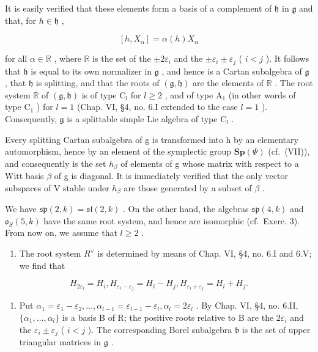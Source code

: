 It is easily verified that these elements form a basis of a complement of \(\mathfrak{h}\) in \(\mathfrak{g}\) and that, for \(h\in \mathfrak{h}\) ,

\[
[ h, X _ {\alpha} ] = \alpha (h) X _ {\alpha}\tag{7}
\]

for all \(\alpha \in \mathbb{R}\) , where \(\mathbb{R}\) is the set of the \(\pm 2\varepsilon_{i}\) and the \(\pm \varepsilon_{i} \pm \varepsilon_{j}\) ( \(i < j\) ). It follows that \(\mathfrak{h}\) is equal to its own normalizer in \(\mathfrak{g}\) , and hence is a Cartan subalgebra of \(\mathfrak{g}\) , that \(\mathfrak{h}\) is splitting, and that the roots of \((\mathfrak{g}, \mathfrak{h})\) are the elements of \(\mathbb{R}\) . The root system \(\mathbb{R}\) of \((\mathfrak{g}, \mathfrak{h})\) is of type \(\mathrm{C}_{l}\) for \(l \geq 2\) , and of type \(\mathrm{A}_{1}\) (in other words of type \(\mathrm{C}_{1}\) ) for \(l = 1\) (Chap. VI, §4, no. 6.I extended to the case \(l = 1\) ). Consequently, \(\mathfrak{g}\) is a splittable simple Lie algebra of type \(\mathrm{C}_{l}\) .

Every splitting Cartan subalgebra of g is transformed into h by an elementary automorphism, hence by an element of the symplectic group \(\mathbf{Sp}(\varPsi)\) (cf.~(VII)), and consequently is the set \(h_{\beta}\) of elements of g whose matrix with respect to a Witt basis \(\beta\) of g is diagonal. It is immediately verified that the only vector subspaces of V stable under \(h_{\beta}\) are those generated by a subset of \(\beta\) .

We have \(\mathfrak{sp}(2,k) = \mathfrak{sl}(2,k)\) . On the other hand, the algebras \(\mathfrak{sp}(4,k)\) and \(\mathfrak{o}_S(5,k)\) have the same root system, and hence are isomorphic (cf.~Exerc. 3). From now on, we assume that \(l \geq 2\) .

\begin{enumerate}
\def\labelenumi{(\Roman{enumi})}
\setcounter{enumi}{1}
\tightlist
\item
  The root system \(R^{\vee}\) is determined by means of Chap. VI, §4, no. 6.I and 6.V; we find that
\end{enumerate}

\[
H _ {2 \varepsilon_ {i}} = H _ {i}, H _ {\varepsilon_ {i} - \varepsilon_ {j}} = H _ {i} - H _ {j}, H _ {\varepsilon_ {i} + \varepsilon_ {j}} = H _ {i} + H _ {j}.
\]

\begin{enumerate}
\def\labelenumi{(\Roman{enumi})}
\setcounter{enumi}{2}
\tightlist
\item
  Put \(\alpha_{1} = \varepsilon_{1} - \varepsilon_{2},\ldots ,\alpha_{l - 1} = \varepsilon_{l - 1} - \varepsilon_{l},\alpha_{l} = 2\varepsilon_{l}\) . By Chap. VI, §4, no. 6.II, \(\{\alpha_1,\dots ,\alpha_l\}\) is a basis B of R; the positive roots relative to B are the \(2\varepsilon_{i}\) and the \(\varepsilon_{i}\pm \varepsilon_{j}\) ( \(i < j\) ). The corresponding Borel subalgebra \(\mathfrak{b}\) is the set of upper triangular matrices in \(\mathfrak{g}\) .
\end{enumerate}

